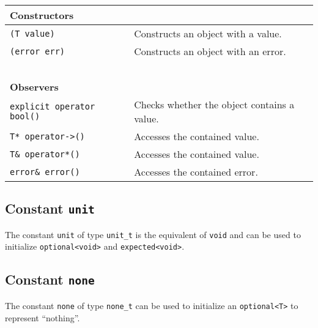 \begin{center}
\begin{tabular}{ll}
  \textbf{Constructors} & ~ \\
  \hline
  \lstinline^(T value)^ & Constructs an object with a value. \\
  \hline
  \lstinline^(error err)^ & Constructs an object with an error. \\
  \hline
  ~ & ~ \\ \textbf{Observers} & ~ \\
  \hline
  \lstinline^explicit operator bool()^ & Checks whether the object contains a value. \\
  \hline
  \lstinline^T* operator->()^ & Accesses the contained value. \\
  \hline
  \lstinline^T& operator*()^ & Accesses the contained value. \\
  \hline
  \lstinline^error& error()^ & Accesses the contained error. \\
  \hline
\end{tabular}
\end{center}


\subsection{Constant \lstinline^unit^}

The constant \lstinline^unit^ of type \lstinline^unit_t^ is the equivalent of
\lstinline^void^ and can be used to initialize \lstinline^optional<void>^ and
\lstinline^expected<void>^.

\subsection{Constant \lstinline^none^}

The constant \lstinline^none^ of type \lstinline^none_t^ can be used to
initialize an \lstinline^optional<T>^ to represent ``nothing''.
